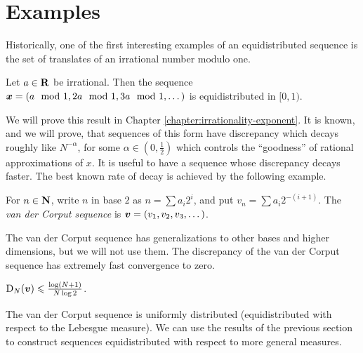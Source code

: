 \section{Examples}

Historically, one of the first interesting examples of an equidistributed 
sequence is the set of translates  of an irrational number modulo one. 

\begin{theorem}
Let $a\in \mathbf{R}$ be irrational. Then the sequence 
${\boldsymbol x}=(a\mod 1,2a\mod 1,3a\mod 1,\dots)$ is equidistributed in $[0,1)$. 
\end{theorem}

We will prove this result in Chapter \ref{chapter:irrationality-exponent}. It 
is known, and we will prove, that 
sequences of this form have discrepancy which decays roughly like 
$N^{-\alpha}$, for some $\alpha\in \left(0,\frac 1 2\right)$ which controls the 
``goodness'' of rational approximations of $x$. It is useful to have a sequence 
whose discrepancy decays faster. The best known rate of decay is achieved by 
the following example. 

\begin{definition}\label{def:van-der-corput}
For $n\in \mathbf{N}$, write $n$ in base $2$ as $n = \sum a_i 2^i$, and put 
$v_n = \sum a_i 2^{-(i+1)}$. The \emph{van der Corput sequence} is 
${\boldsymbol v} = (v_1,v_2,v_3,\dots)$.
\end{definition}

The van der Corput sequence has generalizations to other bases and higher 
dimensions, but we will not use them. The discrepancy of the van der Corput 
sequence has extremely fast convergence to zero. 

\begin{lemma}
\label{lem:vdc-disc}
$\operatorname{D}_N({\boldsymbol v}) \leqslant \frac{\log(N+1)}{N\log 2}$. 
\end{lemma}

The van der Corput sequence is uniformly distributed (equidistributed with 
respect to the Lebesgue measure). We can use the results of the previous 
section to construct sequences equidistributed with respect to more general 
measures. 

